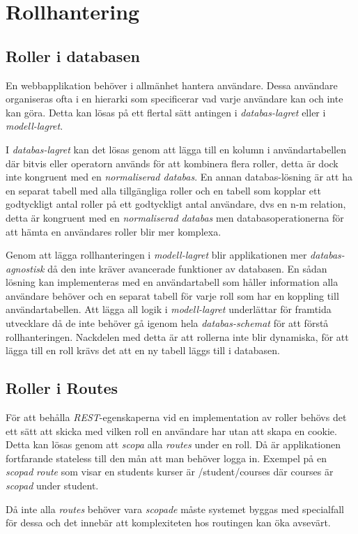 \section{Rollhantering}

\subsection{Roller i databasen}

En webbapplikation behöver i allmänhet hantera användare. Dessa användare organiseras ofta i en hierarki som specificerar vad varje användare kan och inte kan göra. Detta kan lösas på ett flertal sätt antingen i \emph{databas-lagret} eller i \emph{modell-lagret}.

I \emph{databas-lagret} kan det lösas genom att lägga till en kolumn i användartabellen där bitvis eller 
operatorn används för att kombinera flera roller, detta är dock inte kongruent med en \emph{normaliserad databas}. En annan databas-lösning är att ha en separat tabell med alla tillgängliga roller och en tabell som kopplar ett godtyckligt antal roller på ett godtyckligt antal användare, dvs en n-m relation, detta är kongruent med en \emph{normaliserad databas} men databasoperationerna för att hämta en användares roller blir mer komplexa.

Genom att lägga rollhanteringen i \emph{modell-lagret} blir applikationen mer \emph{databas-agnostisk} då den inte kräver avancerade funktioner av databasen. En sådan lösning kan implementeras med en användartabell som håller information alla användare behöver och en separat tabell för varje roll som har en koppling till användartabellen. Att lägga all logik i \emph{modell-lagret} underlättar för framtida utvecklare då de inte behöver gå igenom hela \emph{databas-schemat} för att förstå rollhanteringen. Nackdelen med detta är att rollerna inte blir dynamiska, för att lägga till en roll krävs det att en ny tabell läggs till i databasen.

\subsection{Roller i Routes}

För att behålla \emph{REST}-egenskaperna vid en implementation av roller behövs det ett sätt att skicka med vilken roll en användare har utan att skapa en cookie. Detta kan lösas genom att \emph{scopa} alla \emph{routes} under en roll. Då är applikationen fortfarande stateless till den mån att man behöver logga in. 
Exempel på en \emph{scopad} \emph{route} som visar en students kurser är /student/courses där courses är \emph{scopad} under student.

Då inte alla \emph{routes} behöver vara \emph{scopade} måste systemet byggas med specialfall för dessa och det innebär att komplexiteten hos routingen kan öka avsevärt.
